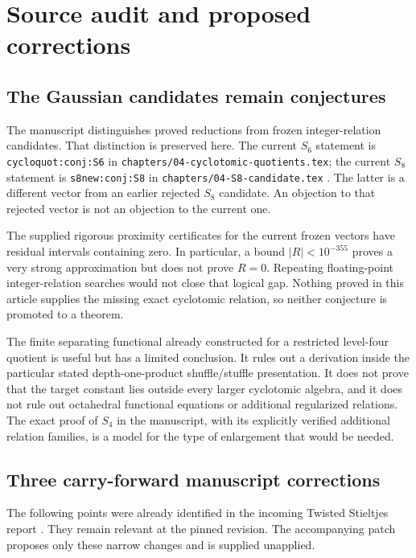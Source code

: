 \section{Source audit and proposed corrections}
\label{audit:sec}

\subsection{The Gaussian candidates remain conjectures}

The manuscript distinguishes proved reductions from frozen
integer-relation candidates. That distinction is preserved here.
The current $S_6$ statement is
\texttt{cycloquot:conj:S6} in
\texttt{chapters/04-cyclotomic-quotients.tex}; the current $S_8$
statement is \texttt{s8new:conj:S8} in
\texttt{chapters/04-S8-candidate.tex} \cite{Repo}.
The latter is a different vector from an earlier rejected $S_8$
candidate. An objection to that rejected vector is not an objection
to the current one.

The supplied rigorous proximity certificates for the current frozen
vectors have residual intervals containing zero. In particular, a
bound $|R|<10^{-355}$ proves a very strong approximation but does not
prove $R=0$. Repeating floating-point integer-relation searches would
not close that logical gap. Nothing proved in this article supplies
the missing exact cyclotomic relation, so neither conjecture is
promoted to a theorem.

The finite separating functional already constructed for a restricted
level-four quotient is useful but has a limited conclusion. It rules
out a derivation inside the particular stated depth-one-product
shuffle/stuffle presentation. It does not prove that the target
constant lies outside every larger cyclotomic algebra, and it does
not rule out octahedral functional equations or additional
regularized relations. The exact proof of $S_4$ in the manuscript,
with its explicitly verified additional relation families, is a
model for the type of enlargement that would be needed.



\subsection{Three carry-forward manuscript corrections}

The following points were already identified in the incoming
Twisted Stieltjes report \cite{IncomingTwisted}. They remain relevant
at the pinned revision. The accompanying patch proposes only these
narrow changes and is supplied unapplied.

